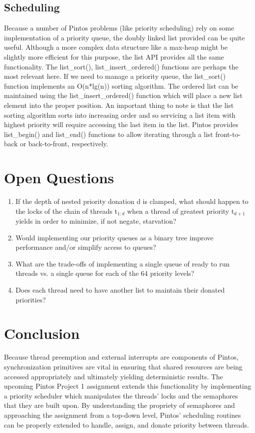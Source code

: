 \documentclass[11pt, letterpaper]{article}
\begin{document}
\subsection{Scheduling}
Because a number of Pintos problems (like priority scheduling) rely on some implementation of a priority queue, the doubly linked list provided can be quite useful. Although a more complex data structure like a max-heap might be slightly more efficient for this purpose, the list API provides all the same functionality. The list\_sort(), list\_insert\_ordered() functions are perhaps the most relevant here. If we need to manage a priority queue, the list\_sort() function implements an O(n*lg(n)) sorting algorithm. The ordered list can be maintained using the list\_insert\_ordered() function which will place a new list element into the proper position. An important thing to note is that the list sorting algorithm sorts into increasing order and so servicing a list item with highest priority will require accessing the last item in the list. Pintos provides list\_begin() and list\_end() functions to allow iterating through a list front-to-back or back-to-front, respectively.

\section*{Open Questions}


\begin{enumerate}
\item If the depth of nested priority donation d is clamped, what should happen to the locks of the chain of threads t$_{1:d}$ when a thread of greatest priority t$_{d+1}$ yields in order to minimize, if not negate, starvation?
\item Would implementing our priority queues as a binary tree improve performance and/or simplify access to queues?
\item What are the trade-offs of implementing a single queue of ready to run threads vs. a single queue for each of the 64 priority levels?
\item Does each thread need to have another list to maintain their donated priorities?
\end{enumerate}



\section*{Conclusion}

Because thread preemption and external interrupts are components of Pintos, synchronization primitives are vital in ensuring that shared resources are being accessed appropriately and ultimately yielding deterministic results. The upcoming Pintos Project 1 assignment extends this functionality by implementing a priority scheduler which manipulates the threads’ locks and the semaphores that they are built upon. By understanding the propriety of semaphores and approaching the assignment from a top-down level, Pintos’ scheduling routines can be properly extended to handle, assign, and donate priority between threads.
\end{document}
